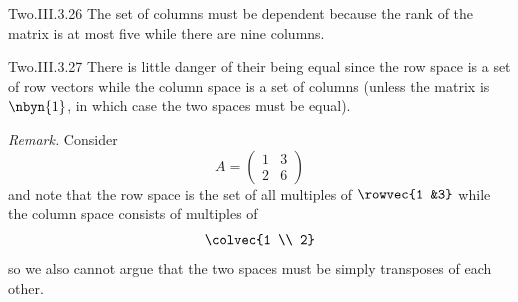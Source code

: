 \begin{ans}{Two.III.3.26}
      The set of columns must be dependent because the rank of the matrix
      is at most five while there are nine columns.
    
\end{ans}
\begin{ans}{Two.III.3.27}
      There is little danger of their being equal since the row space
      is a set of row vectors while the column space is a set of
      columns (unless the matrix is \( \nbyn{1} \), in which case
      the two spaces must be equal).

      \textit{Remark.}
      Consider
      \begin{equation*}
        A=\begin{pmatrix}
            1  &3  \\
            2  &6
          \end{pmatrix}
      \end{equation*}
      and note that the row space is the set of
      all multiples of \( \rowvec{1 &3} \)
      while the column space consists of multiples of
      \begin{equation*}
        \colvec{1 \\ 2}
      \end{equation*}
      so we also cannot argue that the two spaces must be simply
      transposes of each other.
    
\end{ans}

